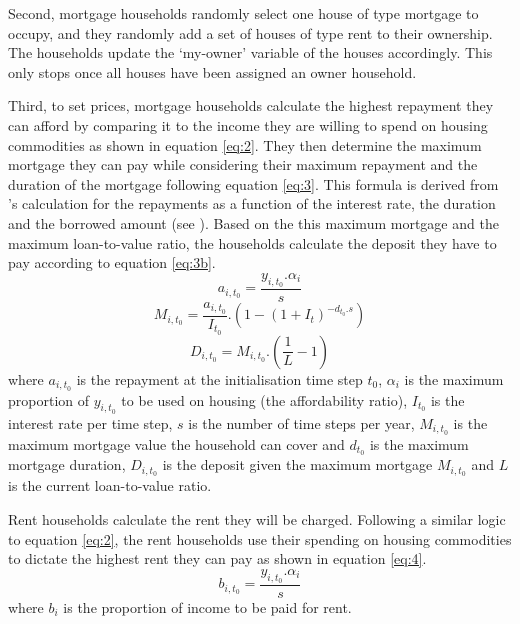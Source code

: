 Second, mortgage households randomly select one house of type mortgage to occupy, and they randomly add a set of houses of type rent to their ownership. The households update the `my-owner' variable of the houses accordingly. This only stops once all houses have been assigned an owner household. 

Third, to set prices, mortgage households calculate the highest repayment they can afford by comparing it to the income they are willing to spend on housing commodities as shown in equation \ref{eq:2}. They then determine the maximum mortgage they can pay while considering their maximum repayment and the duration of the mortgage following equation \ref{eq:3}. This formula is derived from \citet{Kohn1990}'s calculation for the repayments as a function of the interest rate, the duration and the borrowed amount (see ). Based on the this maximum mortgage and the maximum loan-to-value ratio, the households calculate the deposit they have to pay according to equation \ref{eq:3b}.
\begin{equation} \label{eq:2}
    a_{i,{t_0}} = \frac{y_{i,{t_0}}.\alpha_i}{s}
\end{equation}
\begin{equation} \label{eq:3}
    M_{i,{t_0}} = \frac{a_{i,{t_0}}}{I_{t_0}}.(1 - (1 + I_t)^{-d_{t_0}.s})
\end{equation}
\begin{equation} \label{eq:3b}
    D_{i,{t_0}} = M_{i,{t_0}} . (\frac{1}{L} - 1)
\end{equation}
where \(a_{i,t_0}\) is the repayment at the initialisation time step \({t_0}\), \(\alpha_i\) is the maximum proportion of \(y_{i,t_0}\) to be used on housing (the affordability ratio), \(I_{t_0}\) is the interest rate per time step, \(s\) is the number of time steps per year, \(M_{i,{t_0}}\) is the maximum mortgage value the household can cover and \(d_{t_0}\) is the maximum mortgage duration, \(D_{i,{t_0}}\) is the deposit given the maximum mortgage \(M_{i,{t_0}}\) and \(L\) is the current loan-to-value ratio.

Rent households calculate the rent they will be charged. Following a similar logic to equation \ref{eq:2}, the rent households use their spending on housing commodities to dictate the highest rent they can pay as shown in equation \ref{eq:4}.
\begin{equation} \label{eq:4}
    b_{i,{t_0}} = \frac{y_{i,{t_0}}.\alpha_i}{s}
\end{equation}
where \(b_i\) is the proportion of income to be paid for rent.

